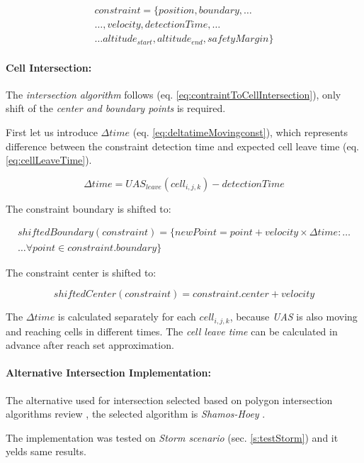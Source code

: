 \begin{multline}\label{eq:movingConstraintDefinition}
    constraint = \{position,boundary,\dots\\\dots, velocity, detection Time, \dots \\\dots altitude_{start},altitude_{end}, safety Margin\}
\end{multline}

\paragraph{Cell Intersection:} The \emph{intersection algorithm} follows (eq. \ref{eq:contraintToCellIntersection}), only shift of the \emph{center and boundary points} is required. 

First let us introduce $\Delta time$ (eq. \ref{eq:deltatimeMovingconst}), which represents difference between the constraint detection time and expected cell leave time (eq. \ref{eq:cellLeaveTime}).

\begin{equation}\label{eq:deltatimeMovingconst}
    \Delta time = UAS_{leave}(cell_{i,j,k}) - detection Time
\end{equation}

\noindent The constraint boundary is shifted to:

\begin{multline}
    shifted Boundary(constraint) = \{new Point = point + velocity \times \Delta time:\dots\\\dots \forall point \in constraint.boundary \}
\end{multline}

\noindent The constraint center is shifted to:

\begin{equation}
    shifted Center(constraint) = constraint.center + velocity
\end{equation}

\begin{note}
    The $\Delta time$ is calculated separately for each $cell_{i,j,k}$, because \emph{UAS} is also  moving and reaching cells in different times. The \emph{cell leave time} can be calculated in advance after reach set approximation.
\end{note}


\paragraph{Alternative Intersection Implementation:} The alternative used for intersection selected based on polygon intersection algorithms review \citep{bentley1979algorithms}, the selected algorithm  is \emph{Shamos-Hoey} \cite{shamos1976geometric}.

The implementation was tested on \emph{Storm scenario} (sec. \ref{s:testStorm}) and it yelds same results.